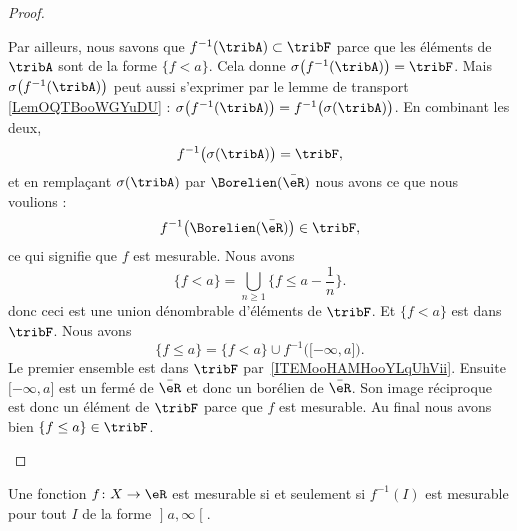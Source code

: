 \begin{proof}
\begin{subproof}
		Par ailleurs, nous savons que \( f^{-1}(\tribA)\subset\tribF\) parce que les éléments de \( \tribA\) sont de la forme \( \{ f<a \}\). Cela donne \( \sigma\big( f^{-1}(\tribA) \big)=\tribF\). Mais \( \sigma\big( f^{-1}(\tribA) \big)\) peut aussi s'exprimer par le lemme de transport \ref{LemOQTBooWGYuDU} : \( \sigma\big( f^{-1}(\tribA) \big)=f^{-1}\big( \sigma(\tribA) \big)\). En combinant les deux,
		\begin{equation}
			f^{-1}\big( \sigma(\tribA) \big)=\tribF,
		\end{equation}
		et en remplaçant \( \sigma(\tribA)\) par \( \Borelien(\bar \eR)\) nous avons ce que nous voulions :
		\begin{equation}
			f^{-1}\big( \Borelien(\bar\eR) \big)\in\tribF,
		\end{equation}
		ce qui signifie que \( f\) est mesurable.
		\spitem[\ref{ITEMooHAMHooYLqUhViii}\( \Rightarrow\)\ref{ITEMooHAMHooYLqUhVii}]
		Nous avons
		\begin{equation}
			\{ f<a \}=\bigcup_{n\geq 1}\{ f\leq a-\frac{1}{ n } \}.
		\end{equation}
		donc ceci est une union dénombrable d'éléments de \( \tribF\). Et \( \{ f<a \}\) est dans \( \tribF\).
		\spitem[\ref{ITEMooHAMHooYLqUhVi}\( \Rightarrow\)\ref{ITEMooHAMHooYLqUhViii}]
		Nous avons
		\begin{equation}
			\{ f\leq a \}=\{ f<a \}\cup f^{-1}\big( \mathopen[ -\infty , a \mathclose] \big).
		\end{equation}
		Le premier ensemble est dans \( \tribF\) par~\ref{ITEMooHAMHooYLqUhVii}. Ensuite \( \mathopen[ -\infty , a \mathclose]\) est un fermé de \( \bar \eR\) et donc un borélien de \( \bar \eR\). Son image réciproque est donc un élément de \( \tribF\) parce que \( f\) est mesurable. Au final nous avons bien \( \{ f\leq a \}\in\tribF\).
	\end{subproof}
\end{proof}

\begin{lemma}   \label{LemFOlheqw}
	Une fonction \( f\colon X\to \eR\) est mesurable si et seulement si \( f^{-1}(I)\) est mesurable pour tout \( I\) de la forme \( \mathopen] a , \infty \mathclose[\).
\end{lemma}

